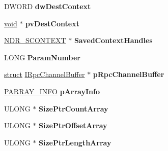 \begin{DoxyCompactItemize}
D\+W\+O\+RD {\bfseries dw\+Dest\+Context}
\item 
\mbox{\label{struct___m_i_d_l___s_t_u_b___m_e_s_s_a_g_e_a645c7289b5b76520e3bd590d1e6ee3c3}} 
\hyperlink{interfacevoid}{void} $\ast$ {\bfseries pv\+Dest\+Context}
\item 
\mbox{\label{struct___m_i_d_l___s_t_u_b___m_e_s_s_a_g_e_a36f7aa3a604ce95544a85ed495ba960a}} 
\hyperlink{structtag_n_d_r___s_c_o_n_t_e_x_t}{N\+D\+R\+\_\+\+S\+C\+O\+N\+T\+E\+XT} $\ast$ {\bfseries Saved\+Context\+Handles}
\item 
\mbox{\label{struct___m_i_d_l___s_t_u_b___m_e_s_s_a_g_e_a3d30c46334d353b69057a8360063f428}} 
L\+O\+NG {\bfseries Param\+Number}
\item 
\mbox{\label{struct___m_i_d_l___s_t_u_b___m_e_s_s_a_g_e_a75753e52d19428e403692ae274f92644}} 
\hyperlink{interfacestruct}{struct} \hyperlink{interface_i_rpc_channel_buffer}{I\+Rpc\+Channel\+Buffer} $\ast$ {\bfseries p\+Rpc\+Channel\+Buffer}
\item 
\mbox{\label{struct___m_i_d_l___s_t_u_b___m_e_s_s_a_g_e_a89e59de8a78d980089815d1223eb5214}} 
\hyperlink{struct_a_r_r_a_y___i_n_f_o}{P\+A\+R\+R\+A\+Y\+\_\+\+I\+N\+FO} {\bfseries p\+Array\+Info}
\item 
\mbox{\label{struct___m_i_d_l___s_t_u_b___m_e_s_s_a_g_e_a7a3e3e90e63261bb3ec5d6fb517f4b54}} 
U\+L\+O\+NG $\ast$ {\bfseries Size\+Ptr\+Count\+Array}
\item 
\mbox{\label{struct___m_i_d_l___s_t_u_b___m_e_s_s_a_g_e_a61a00ea3190b79df79bfd607074684da}} 
U\+L\+O\+NG $\ast$ {\bfseries Size\+Ptr\+Offset\+Array}
\item 
\mbox{\label{struct___m_i_d_l___s_t_u_b___m_e_s_s_a_g_e_a2fb25202e926bde15f3030f2e206090d}} 
U\+L\+O\+NG $\ast$ {\bfseries Size\+Ptr\+Length\+Array}
\item 
\mbox{\label{struct___m_i_d_l___s_t_u_b___m_e_s_s_a_g_e_ac6e1294ee2c90f06600631abf6cd1989}} 

\end{DoxyCompactItemize}
